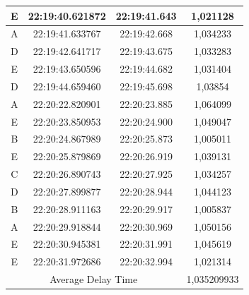 \begin{table}[htpb]
\begin{tabular}{|ccc|c|}
  \multicolumn{1}{|c|}{E}    & \multicolumn{1}{c|}{22:19:40.621872} & 22:19:41.643       & 1,021128    \\ \hline
  \multicolumn{1}{|c|}{A}    & \multicolumn{1}{c|}{22:19:41.633767} & 22:19:42.668       & 1,034233    \\ \hline
  \multicolumn{1}{|c|}{D}    & \multicolumn{1}{c|}{22:19:42.641717} & 22:19:43.675       & 1,033283    \\ \hline
  \multicolumn{1}{|c|}{E}    & \multicolumn{1}{c|}{22:19:43.650596} & 22:19:44.682       & 1,031404    \\ \hline
  \multicolumn{1}{|c|}{D}    & \multicolumn{1}{c|}{22:19:44.659460} & 22:19:45.698       & 1,03854     \\ \hline
  \multicolumn{1}{|c|}{A}    & \multicolumn{1}{c|}{22:20:22.820901} & 22:20:23.885       & 1,064099    \\ \hline
  \multicolumn{1}{|c|}{E}    & \multicolumn{1}{c|}{22:20:23.850953} & 22:20:24.900       & 1,049047    \\ \hline
  \multicolumn{1}{|c|}{B}    & \multicolumn{1}{c|}{22:20:24.867989} & 22:20:25.873       & 1,005011    \\ \hline
  \multicolumn{1}{|c|}{E}    & \multicolumn{1}{c|}{22:20:25.879869} & 22:20:26.919       & 1,039131    \\ \hline
  \multicolumn{1}{|c|}{C}    & \multicolumn{1}{c|}{22:20:26.890743} & 22:20:27.925       & 1,034257    \\ \hline
  \multicolumn{1}{|c|}{D}    & \multicolumn{1}{c|}{22:20:27.899877} & 22:20:28.944       & 1,044123    \\ \hline
  \multicolumn{1}{|c|}{B}    & \multicolumn{1}{c|}{22:20:28.911163} & 22:20:29.917       & 1,005837    \\ \hline
  \multicolumn{1}{|c|}{A}    & \multicolumn{1}{c|}{22:20:29.918844} & 22:20:30.969       & 1,050156    \\ \hline
  \multicolumn{1}{|c|}{E}    & \multicolumn{1}{c|}{22:20:30.945381} & 22:20:31.991       & 1,045619    \\ \hline
  \multicolumn{1}{|c|}{E}    & \multicolumn{1}{c|}{22:20:31.972686} & 22:20:32.994       & 1,021314    \\ \hline
  \multicolumn{3}{|c|}{Average Delay Time}                                               & 1,035209933 \\ \hline
  \end{tabular}
  \end{table}

\newpage

